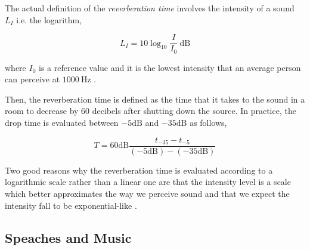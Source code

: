 \documentclass[draft ]{article}
\begin{document}
The actual definition of the \textit{reverberation time} involves the intensity of a sound $L_I$ i.e. the logarithm,

\begin{equation}
L_I = 10 \log_{10}{\frac{I}{I_0}}\ \mathrm{dB}
\end{equation}

where $I_0$ is a reference value and it is the lowest intensity that an average person can perceive at $1000\ \mathrm{Hz}$ \cite{book:acoustic2}.

Then, the reverberation time is defined as the time that it takes to the sound in a room to decrease by $60$ decibels after shutting down the source. In practice, the drop time is evaluated between $-5 \mathrm{dB}$ and $-35 \mathrm{dB}$ as follows,

\begin{equation}
T = 60 \mathrm{dB} \frac{t_{-35} - t_{-5}}{(-5\mathrm{dB}) - (-35\mathrm{dB})}
\end{equation}

Two good reasons why the reverberation time is evaluated according to a logarithmic scale rather than a linear one are that the intensity level is a scale which better approximates the way we perceive sound \cite{book:acoustic2} and that we expect the intensity fall to be exponential-like \cite{book:acoustic}.

\subsection{Speaches and Music}


\printbibliography

%
%
\end{document}
